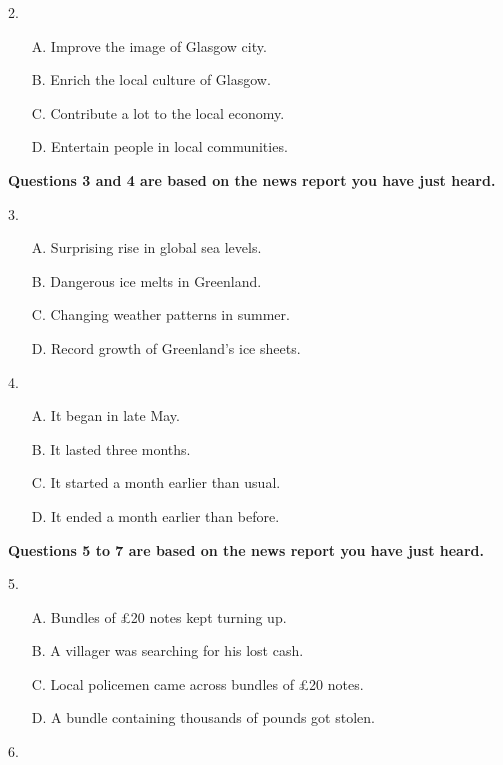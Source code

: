 \documentclass[UTF8,11pt]{ctexart}
\begin{document}
2.


\begin{itemize}[leftmargin=2em,itemsep=.2em,topsep=.4em]\item[A.] Improve the image of Glasgow city.
\item[B.] Enrich the local culture of Glasgow.
\item[C.] Contribute a lot to the local economy.
\item[D.] Entertain people in local communities.
\end{itemize}

\textbf{Questions 3 and 4 are based on the news report you have just heard.}


3.


\begin{itemize}[leftmargin=2em,itemsep=.2em,topsep=.4em]\item[A.] Surprising rise in global sea levels.
\item[B.] Dangerous ice melts in Greenland.
\item[C.] Changing weather patterns in summer.
\item[D.] Record growth of Greenland's ice sheets.
\end{itemize}

4.


\begin{itemize}[leftmargin=2em,itemsep=.2em,topsep=.4em]\item[A.] It began in late May.
\item[B.] It lasted three months.
\item[C.] It started a month earlier than usual.
\item[D.] It ended a month earlier than before.
\end{itemize}

\textbf{Questions 5 to 7 are based on the news report you have just heard.}


5.


\begin{itemize}[leftmargin=2em,itemsep=.2em,topsep=.4em]\item[A.] Bundles of £20 notes kept turning up.
\item[B.] A villager was searching for his lost cash.
\item[C.] Local policemen came across bundles of £20 notes.
\item[D.] A bundle containing thousands of pounds got stolen.
\end{itemize}

6.
\end{document}
